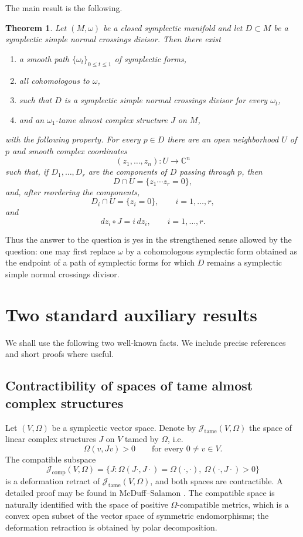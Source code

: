 \documentclass{amsart}
\newtheorem{theorem}{Theorem}
\theoremstyle{definition}
\newcommand{\C}{\mathbb C}
\begin{document}
The main result is the following.

\begin{theorem}\label{thm:main}
Let $(M,\omega)$ be a closed symplectic manifold and let $D\subset M$ be a symplectic simple
normal crossings divisor. Then there exist

\begin{enumerate}
\item a smooth path $\{\omega_t\}_{0\le t\le 1}$ of symplectic forms,
\item all cohomologous to $\omega$,
\item such that $D$ is a symplectic simple normal crossings divisor for every $\omega_t$,
\item and an $\omega_1$-tame almost complex structure $J$ on $M$,
\end{enumerate}
with the following property. For every $p\in D$ there are an open neighborhood $U$ of $p$
and smooth complex coordinates
\[
(z_1,\dots,z_n):U\longrightarrow \C^n
\]
such that, if $D_1,\dots,D_r$ are the components of $D$ passing through $p$, then
\[
D\cap U=\{z_1\cdots z_r=0\},
\]
and, after reordering the components,
\[
D_i\cap U=\{z_i=0\},\qquad i=1,\dots,r,
\]
and
\[
dz_i\circ J=i\,dz_i,\qquad i=1,\dots,r.
\]
\end{theorem}

Thus the answer to the question is yes in the strengthened sense allowed by the question:
one may first replace $\omega$ by a cohomologous symplectic form obtained as the endpoint of
a path of symplectic forms for which $D$ remains a symplectic simple normal crossings divisor.

\section{Two standard auxiliary results}

We shall use the following two well-known facts. We include precise references and short
proofs where useful.

\subsection{Contractibility of spaces of tame almost complex structures}

Let $(V,\Omega)$ be a symplectic vector space. Denote by
$\mathcal J_{\mathrm{tame}}(V,\Omega)$ the space of linear complex structures $J$ on $V$
tamed by $\Omega$, i.e.
\[
\Omega(v,Jv)>0\qquad\text{for every }0\neq v\in V.
\]
The compatible subspace
\[
\mathcal J_{\mathrm{comp}}(V,\Omega)
=
\{J:\Omega(J\cdot,J\cdot)=\Omega(\cdot,\cdot),\ \Omega(\cdot,J\cdot)>0\}
\]
is a deformation retract of $\mathcal J_{\mathrm{tame}}(V,\Omega)$, and both spaces are
contractible. A detailed proof may be found in McDuff--Salamon
\cite[Section 2.5]{McDuffSalamon}. The compatible space is naturally identified with the
space of positive $\Omega$-compatible metrics, which is a convex open subset of the vector
space of symmetric endomorphisms; the deformation retraction is obtained by polar
decomposition.
\end{document}
